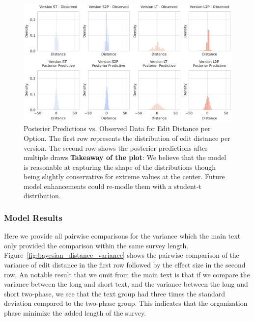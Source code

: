 \begin{figure}[h!]
    \centering
    \includegraphics[width=\textwidth]{content/image/distance/observed_vs_posterior_predictive_histogram_m2.pdf}
    \caption{Posterier Predictions vs. Observed Data for Edit Distance per Option. The first row represents the distribution of edit distance per version. The second row shows the posterier predictions after multiple draws \textbf{Takeaway of the plot}: We believe that the model is reasonable at capturing the shape of the distributions though being slightly conservative for extreme values at the center. Future model enhancements could re-modle them with a student-t distribution.}
    \label{fig:observed_vs_posterior_predictive_histogram_m2}
\end{figure}

\subsubsection{Model Results}
Here we provide all pairwise comparisons for the variance which the main text only provided the comparison within the same survey length. Figure~\ref{fig:bayesian_distance_variance} shows the pairwise comparison of the variance of edit distance in the first row followed by the effect size in the second row. An notable result that we omit from the main text is that if we compare the variance between the long and short text, and the variance between the long and short two-phase, we see that the text group had three times the standard deviation compared to the two-phase group. This indicates that the organization phase minimize the added length of the survey.

